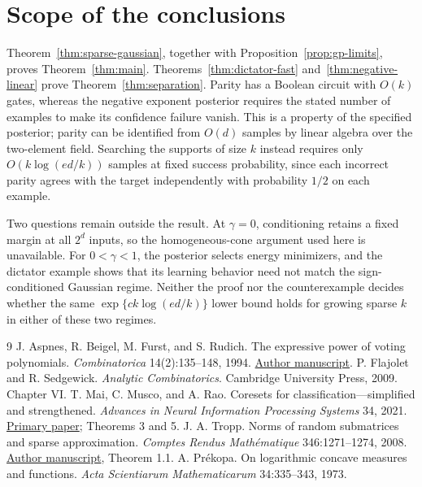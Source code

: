\documentclass[11pt]{article}
\theoremstyle{remark}\newtheorem{remark}[theorem]{Remark}
\begin{document}
\section{Scope of the conclusions}
Theorem~\ref{thm:sparse-gaussian}, together with
Proposition~\ref{prop:gp-limits}, proves Theorem~\ref{thm:main}.
Theorems~\ref{thm:dictator-fast} and~\ref{thm:negative-linear} prove
Theorem~\ref{thm:separation}.
Parity has a Boolean circuit with $O(k)$ gates, whereas the negative
exponent posterior requires the stated number of examples to make its
confidence failure vanish. This is a property of the specified posterior;
parity can be identified from $O(d)$ samples by linear algebra over
the two-element field. Searching the supports of size $k$ instead
requires only $O(k\log(ed/k))$ samples at fixed success probability,
since each incorrect parity agrees with the target independently with
probability $1/2$ on each example.

Two questions remain outside the result. At $\gamma=0$, conditioning
retains a fixed margin at all $2^d$ inputs, so the homogeneous-cone
argument used here is unavailable. For $0<\gamma<1$, the posterior
selects energy minimizers, and the dictator example shows that its
learning behavior need not match the sign-conditioned Gaussian regime.
Neither the proof nor the counterexample decides whether the same
$\exp\{c k\log(ed/k)\}$ lower bound holds for growing sparse $k$ in
either of these two regimes.

\begin{thebibliography}{9}
J. Aspnes, R. Beigel, M. Furst, and S. Rudich.
The expressive power of voting polynomials.
\emph{Combinatorica} 14(2):135--148, 1994.
\href{https://www.cs.yale.edu/homes/aspnes/papers/stoc91voting.pdf}{Author manuscript}.
P. Flajolet and R. Sedgewick. \emph{Analytic Combinatorics}.
Cambridge University Press, 2009. Chapter VI.
T. Mai, C. Musco, and A. Rao.
Coresets for classification---simplified and strengthened.
\emph{Advances in Neural Information Processing Systems} 34, 2021.
\href{https://papers.neurips.cc/paper_files/paper/2021/file/6098ed616e715171f0dabad60a8e5197-Paper.pdf}{Primary paper}; Theorems 3 and 5.
J. A. Tropp. Norms of random submatrices and sparse approximation.
\emph{Comptes Rendus Math\'ematique} 346:1271--1274, 2008.
\href{https://tropp.caltech.edu/papers/Tro08-Norms-Random-v3.pdf}{Author manuscript},
Theorem 1.1.
A. Pr\'ekopa. On logarithmic concave measures and functions.
\emph{Acta Scientiarum Mathematicarum} 34:335--343, 1973.
\end{thebibliography}
\end{document}
